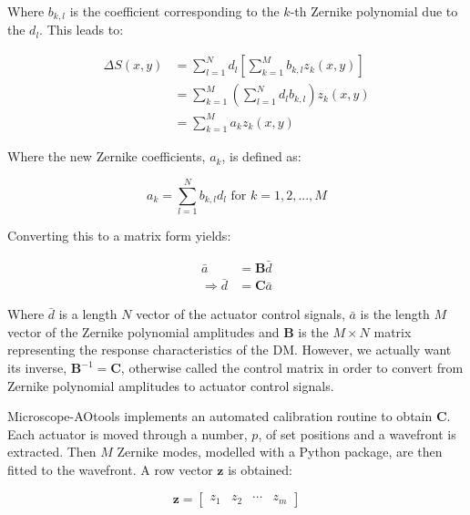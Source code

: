 Where $b_{k,l}$ is the coefficient corresponding to the $k$-th Zernike polynomial due to the $d_l$. This leads to:

\begin{equation}\label{eq:zernike_sub}
\begin{split}
\Delta S(x,y) & = \sum_{l=1}^{N} d_{l}\left[\sum_{k=1}^{M} b_{k,l}z_{k}(x,y)\right] \\
& =\sum_{k=1}^{M} \left(\sum_{l=1}^{N} d_{l} b_{k,l}\right) z_{k}(x,y) \\
& =\sum_{k=1}^{M} a_{k} z_{k}(x,y)
\end{split}
\end{equation}

Where the new Zernike coefficients, $a_{k}$, is defined as:

\begin{equation}\label{eq:new_z_coef}
a_{k} = \sum_{l=1}^{N} b_{k,l} d_{l} \text{~for~} k=1,2,...,M
\end{equation}

Converting this to a matrix form yields:

\begin{equation}\label{eq:CM_derivation}
\begin{split}
\bar{a} &= \boldsymbol{B} \bar{d}\\
\Rightarrow \bar{d} &= \boldsymbol{C} \bar{a}
\end{split}
\end{equation}

Where $\bar{d}$ is a length $N$ vector of the actuator control signals, $\bar{a}$ is the length $M$ vector of the Zernike polynomial amplitudes and $\boldsymbol{B}$ is the $M \times N$ matrix representing the response characteristics of the DM. However, we actually want its inverse, $\boldsymbol{B}^{-1} =\boldsymbol{C}$, otherwise called the control matrix in order to convert from Zernike polynomial amplitudes to actuator control signals.

Microscope-AOtools implements an automated calibration routine to obtain $\boldsymbol{C}$. Each actuator is moved through a number, $p$, of set positions and a wavefront is extracted. Then $M$ Zernike modes, modelled with a Python package, are then fitted to the wavefront.\cite{townson2019aotools} A row vector $\boldsymbol{z}$ is obtained:

\begin{equation}\label{eq:zernike_amp}
\boldsymbol{z} = 
\begin{bmatrix}
z_{1} & z_{2} & \cdots & z_{m} 
\end{bmatrix}
\end{equation}

